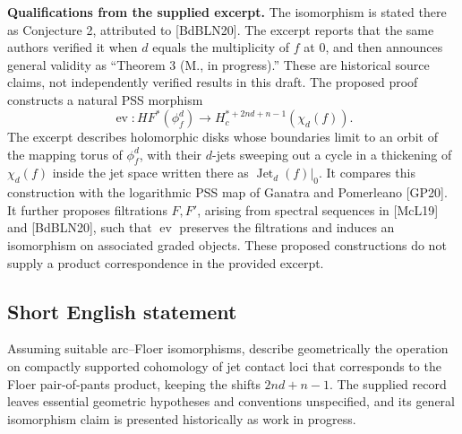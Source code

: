 \documentclass[11pt]{article}
\begin{document}
\textbf{Qualifications from the supplied excerpt.} The isomorphism is stated there as Conjecture 2, attributed to [BdBLN20]. The excerpt reports that the same authors verified it when \(d\) equals the multiplicity of \(f\) at \(0\), and then announces general validity as ``Theorem 3 (M., in progress).'' These are historical source claims, not independently verified results in this draft. The proposed proof constructs a natural PSS morphism
\[
\operatorname{ev}:HF^*(\phi_f^d)\longrightarrow H_c^{*+2nd+n-1}(\chi_d(f)).
\]
The excerpt describes holomorphic disks whose boundaries limit to an orbit of the mapping torus of \(\phi_f^d\), with their \(d\)-jets sweeping out a cycle in a thickening of \(\chi_d(f)\) inside the jet space written there as \(\operatorname{Jet}_d(f)|_0\). It compares this construction with the logarithmic PSS map of Ganatra and Pomerleano [GP20]. It further proposes filtrations \(F,F'\), arising from spectral sequences in [McL19] and [BdBLN20], such that \(\operatorname{ev}\) preserves the filtrations and induces an isomorphism on associated graded objects. These proposed constructions do not supply a product correspondence in the provided excerpt.
\subsection{Short English statement}
Assuming suitable arc--Floer isomorphisms, describe geometrically the operation on compactly supported cohomology of jet contact loci that corresponds to the Floer pair-of-pants product, keeping the shifts \(2nd+n-1\). The supplied record leaves essential geometric hypotheses and conventions unspecified, and its general isomorphism claim is presented historically as work in progress.
\end{document}
